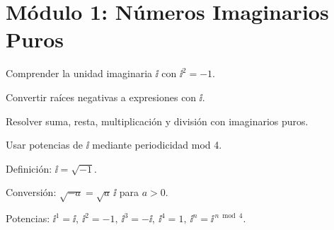 
\section*{Módulo 1: Números Imaginarios Puros}

\begin{objetivos}
  \item Comprender la unidad imaginaria $\ii$ con $\ii^2=-1$.
  \item Convertir raíces negativas a expresiones con $\ii$.
  \item Resolver suma, resta, multiplicación y división con imaginarios puros.
  \item Usar potencias de $\ii$ mediante periodicidad mod 4.
\end{objetivos}

\begin{marcoteorico}
  \item Definición: $\ii=\sqrt{-1}$.
  \item Conversión: $\sqrt{-a}=\sqrt{a}\,\ii$ para $a>0$.
  \item Potencias: $\ii^1=\ii,\ \ii^2=-1,\ \ii^3=-\ii,\ \ii^4=1,\ \ii^{n}=\ii^{\,n\bmod 4}$.
\end{marcoteorico}